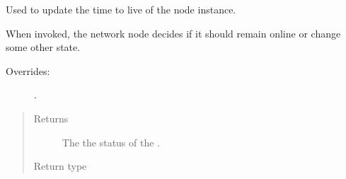 \documentclass[letterpaper,10pt,english]{sphinxmanual}
\begin{document}
\begin{fulllineitems}
\begin{fulllineitems}
\label{\detokenize{app.domain:app.domain.network_nodes.NewscastNode.update_status}}
Used to update the time to live of the node instance.

When invoked, the network node decides if it should remain online or
change some other state.
\begin{description}
\item[{Overrides:}] \leavevmode
{\hyperref[\detokenize{app.domain:app.domain.network_nodes.Node.update_status}]{}}.

\end{description}
\begin{quote}\begin{description}
\item[{Returns}] \leavevmode
The the status of the .

\item[{Return type}] \leavevmode
{\hyperref[\detokenize{app.domain.helpers:app.domain.helpers.enums.Status}]{}}

\end{description}\end{quote}

\end{fulllineitems}


\end{fulllineitems}

\end{document}
